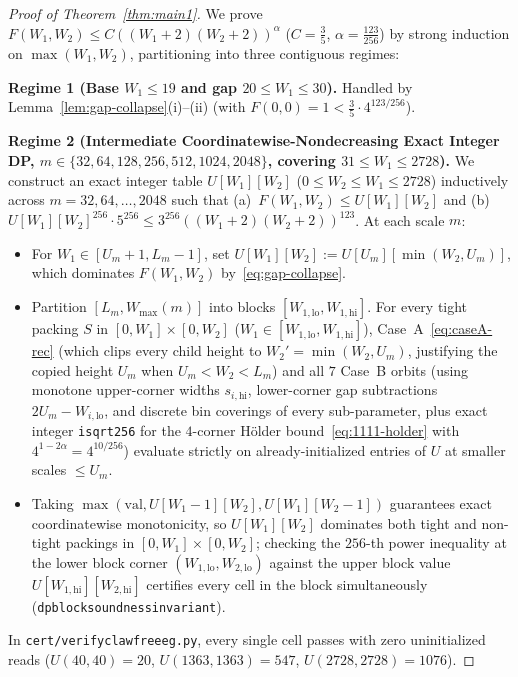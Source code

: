\documentclass[11pt,reqno]{amsart}
\theoremstyle{plain}
\theoremstyle{definition}
\theoremstyle{remark}
\DeclareRobustCommand{\_}{\ifmmode\text{\textunderscore}\else\textunderscore\allowbreak\fi}
\begin{document}
\begin{proof}[Proof of Theorem~\ref{thm:main1}]
We prove $F(W_1, W_2) \le C ((W_1 + 2)(W_2 + 2))^\alpha$ ($C = \frac{3}{5}$, $\alpha = \frac{123}{256}$) by strong induction on $\max(W_1, W_2)$, partitioning into three contiguous regimes:

\medskip
\noindent\textbf{Regime 1 (Base $W_1 \le 19$ and gap $20 \le W_1 \le 30$).}
Handled by Lemma~\ref{lem:gap-collapse}(i)--(ii) (with $F(0, 0) = 1 < \frac{3}{5}\cdot 4^{123/256}$).

\medskip
\noindent\textbf{Regime 2 (Intermediate Coordinatewise-Nondecreasing Exact Integer DP, $m \in \{32, 64, 128, 256, 512, 1024, 2048\}$, covering $31 \le W_1 \le 2728$).}
We construct an exact integer table $U[W_1][W_2]$ ($0 \le W_2 \le W_1 \le 2728$) inductively across $m = 32, 64, \dots, 2048$ such that (a)~$F(W_1, W_2) \le U[W_1][W_2]$ and (b)~$U[W_1][W_2]^{256} \cdot 5^{256} \le 3^{256} ((W_1 + 2)(W_2 + 2))^{123}$. At each scale $m$:
\begin{itemize}[leftmargin=1.6em]
  \item For $W_1 \in [U_m + 1, L_m - 1]$, set $U[W_1][W_2] := U[U_m][\min(W_2, U_m)]$, which dominates $F(W_1, W_2)$ by~\eqref{eq:gap-collapse}.
  \item Partition $[L_m, W_{\max}(m)]$ into blocks $[W_{1,\mathrm{lo}}, W_{1,\mathrm{hi}}]$. For every tight packing $S$ in $[0, W_1] \times [0, W_2]$ ($W_1 \in [W_{1,\mathrm{lo}}, W_{1,\mathrm{hi}}]$), Case~A~\eqref{eq:caseA-rec} (which clips every child height to $W_2' = \min(W_2, U_m)$, justifying the copied height $U_m$ when $U_m < W_2 < L_m$) and all $7$ Case~B orbits (using monotone upper-corner widths $s_{i,\mathrm{hi}}$, lower-corner gap subtractions $2U_m - W_{i,\mathrm{lo}}$, and discrete bin coverings of every sub-parameter, plus exact integer \texttt{isqrt256} for the $4$-corner H\"older bound~\eqref{eq:1111-holder} with $4^{1-2\alpha} = 4^{10/256}$) evaluate strictly on already-initialized entries of $U$ at smaller scales $\le U_m$.
  \item Taking $\max(\mathrm{val}, U[W_1 - 1][W_2], U[W_1][W_2 - 1])$ guarantees exact coordinatewise monotonicity, so $U[W_1][W_2]$ dominates both tight and non-tight packings in $[0, W_1] \times [0, W_2]$; checking the $256$-th power inequality at the lower block corner $(W_{1,\mathrm{lo}}, W_{2,\mathrm{lo}})$ against the upper block value $U[W_{1,\mathrm{hi}}][W_{2,\mathrm{hi}}]$ certifies every cell in the block simultaneously (\texttt{dp\_block\_soundness\_invariant}).
\end{itemize}
In \texttt{cert/verify\_clawfree\_eg.py}, every single cell passes with zero uninitialized reads ($U(40, 40) = 20$, $U(1363, 1363) = 547$, $U(2728, 2728) = 1076$).


\end{proof}
\end{document}
